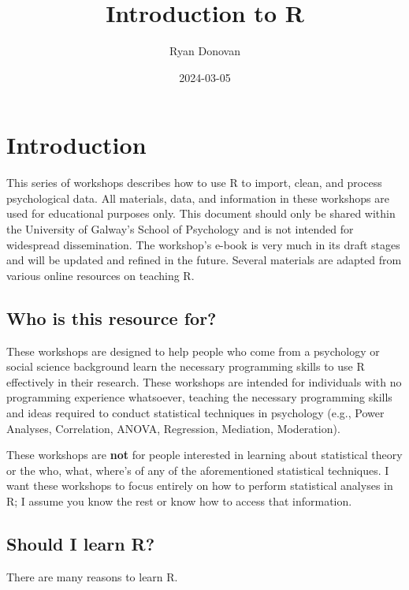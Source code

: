 \documentclass[
]{book}
\title{Introduction to R}
\author{Ryan Donovan}
\date{2024-03-05}
\begin{document}
\maketitle

{
\setcounter{tocdepth}{1}
\tableofcontents
}
\hypertarget{introduction}{%
\chapter{\texorpdfstring{\textbf{Introduction}}{Introduction}}\label{introduction}}

This series of workshops describes how to use R to import, clean, and process psychological data. All materials, data, and information in these workshops are used for educational purposes only. This document should only be shared within the University of Galway's School of Psychology and is not intended for widespread dissemination. The workshop's e-book is very much in its draft stages and will be updated and refined in the future. Several materials are adapted from various online resources on teaching R.

\hypertarget{who-is-this-resource-for}{%
\section{Who is this resource for?}\label{who-is-this-resource-for}}

These workshops are designed to help people who come from a psychology or social science background learn the necessary programming skills to use R effectively in their research. These workshops are intended for individuals with no programming experience whatsoever, teaching the necessary programming skills and ideas required to conduct statistical techniques in psychology (e.g., Power Analyses, Correlation, ANOVA, Regression, Mediation, Moderation).

These workshops are \textbf{not} for people interested in learning about statistical theory or the who, what, where's of any of the aforementioned statistical techniques. I want these workshops to focus entirely on how to perform statistical analyses in R; I assume you know the rest or know how to access that information.

\hypertarget{should-i-learn-r}{%
\section{Should I learn R?}\label{should-i-learn-r}}

There are many reasons to learn R.
\end{document}
